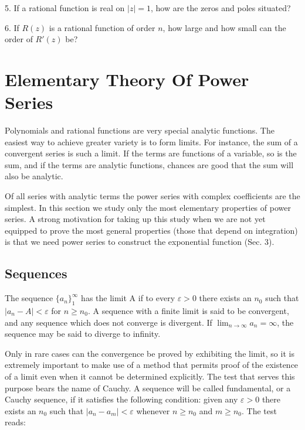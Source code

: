 5. If a rational function is real on $|z| = 1$, how are the zeros and poles situated?

6. If $R(z)$ is a rational function of order $n$, how large and how small can the order of $R'(z)$ be?

\setcounter{section}{1}\section{Elementary Theory Of Power Series}\label{sec:2.2}
Polynomials and rational functions are very special analytic functions. The easiest way to achieve greater variety is to form limits. For instance, the sum of a convergent series is such a limit. If the terms are functions of a variable, so is the sum, and if the terms are analytic functions, chances are good that the sum will also be analytic.

Of all series with analytic terms the power series with complex coefficients are the simplest. In this section we study only the most elementary properties of power series. A strong motivation for taking up this study when we are not yet equipped to prove the most general properties (those that depend on integration) is that we need power series to construct the exponential function (Sec. 3).

\setcounter{section}{2}\setcounter{subsection}{0}\subsection{Sequences}\label{sec:2.2.1}
The sequence $\{a_{n}\}_{1}^{\infty}$ has the limit A if to every $\varepsilon > 0$ there exists an $n_{0}$ such that $|a_{n} - A| < \varepsilon$ for $n \geq n_{0}$. A sequence with a finite limit is said to be convergent, and any sequence which does not converge is divergent. If $\lim_{n \to \infty} a_{n} = \infty$, the sequence may be said to diverge to infinity.

Only in rare cases can the convergence be proved by exhibiting the limit, so it is extremely important to make use of a method that permits proof of the existence of a limit even when it cannot be determined explicitly. The test that serves this purpose bears the name of Cauchy. A sequence will be called fundamental, or a Cauchy sequence, if it satisfies the following condition: given any $\varepsilon > 0$ there exists an $n_{0}$ such that $|a_{n} - a_{m}| < \varepsilon$ whenever $n \geq n_{0}$ and $m \geq n_{0}$. The test reads:


